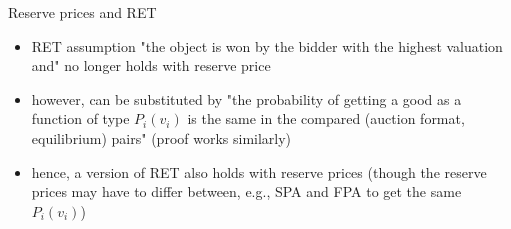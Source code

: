 \documentclass[bigger]{beamer}
\begin{document}
\begin{frame}[label={sec:orge312213}]{Reserve prices and RET}
\begin{itemize}
\item RET assumption "the object is won by the bidder with the highest valuation and" no longer holds with reserve price
\item however, can be substituted by "the probability of getting a good as a function of type \(P_i(v_i)\) is the same in the compared (auction format, equilibrium) pairs" \linebreak (proof works similarly)
\item hence, a version of RET also holds with reserve prices (though the reserve prices may have to differ between, e.g., SPA and FPA to get the same \(P_i(v_i)\))
\end{itemize}
\end{frame}
\end{document}
